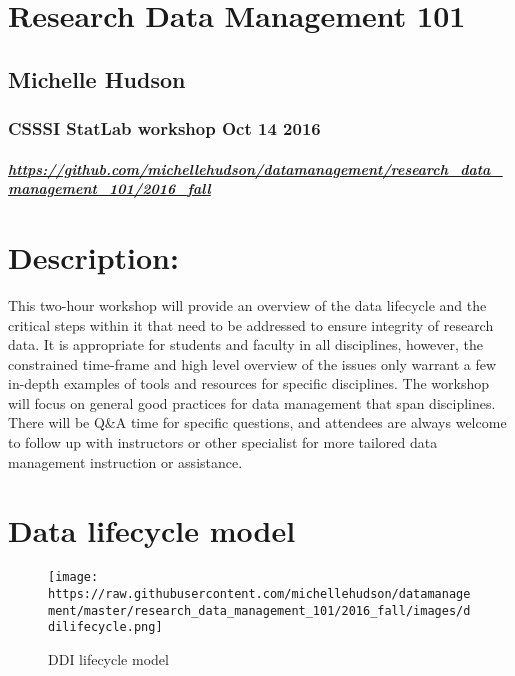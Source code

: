 \section{Research Data Management
101}\label{research-data-management-101}

\subsection{Michelle Hudson}\label{michelle-hudson}

\subsubsection{CSSSI StatLab workshop Oct 14
2016}\label{csssi-statlab-workshop-oct-14-2016}

\subparagraph{\texorpdfstring{\url{https://github.com/michellehudson/datamanagement/research_data_management_101/2016_fall}}{https://github.com/michellehudson/datamanagement/research\_data\_management\_101/2016\_fall}}\label{httpsgithub.commichellehudsondatamanagementresearchux5fdataux5fmanagementux5f1012016ux5ffall}

\section{Description:}\label{description}

This two-hour workshop will provide an overview of the data lifecycle
and the critical steps within it that need to be addressed to ensure
integrity of research data. It is appropriate for students and faculty
in all disciplines, however, the constrained time-frame and high level
overview of the issues only warrant a few in-depth examples of tools and
resources for specific disciplines. The workshop will focus on general
good practices for data management that span disciplines. There will be
Q\&A time for specific questions, and attendees are always welcome to
follow up with instructors or other specialist for more tailored data
management instruction or assistance.

\section{Data lifecycle model}\label{data-lifecycle-model}

\begin{figure}[htbp]
\centering
\texttt{[image: https://raw.githubusercontent.com/michellehudson/datamanagement/master/research\_data\_management\_101/2016\_fall/images/ddilifecycle.png]}
\caption{DDI lifecycle model}
\end{figure}


